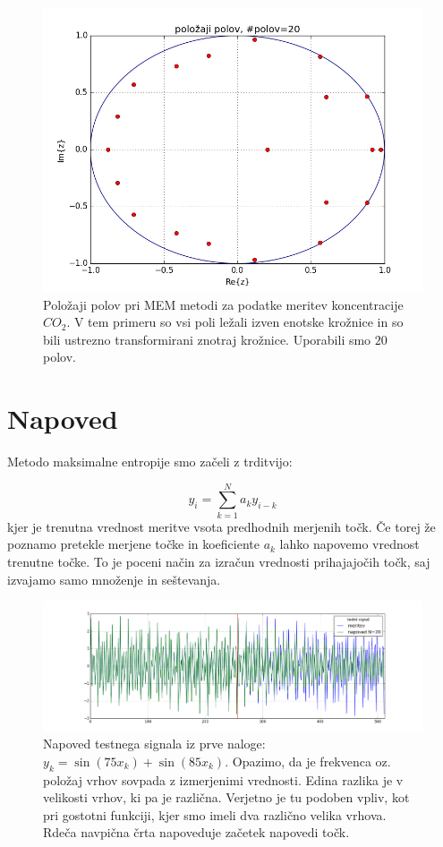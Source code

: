 \documentclass[slovene,11pt,a4paper]{article}
\numberwithin{equation}{section} %
\numberwithin{figure}{section} %
\numberwithin{table}{section} %
\begin{document}
\begin{figure}[!h]
\centering
\includegraphics[scale=0.5]{slike/polozaji_polov.png}
\caption{Položaji polov pri MEM metodi za podatke meritev koncentracije $CO_2$. V tem primeru so vsi poli ležali izven enotske krožnice in so bili ustrezno transformirani znotraj krožnice. Uporabili smo $20$ polov.}
\end{figure}



\FloatBarrier

\section{Napoved}

Metodo maksimalne entropije smo začeli z trditvijo:

\begin{equation}
y_i=\sum_{k=1}^{N} a_k y_{i-k}
\end{equation}
kjer je trenutna vrednost meritve vsota predhodnih merjenih točk. Če torej že poznamo pretekle merjene točke in koeficiente $a_k$ lahko napovemo vrednost trenutne točke. To je poceni način za izračun vrednosti prihajajočih točk, saj izvajamo samo množenje in seštevanja.


\begin{figure}[!h]
\centering
\includegraphics[scale=0.4]{slike/napoved_testni_sin2.png}
\caption{Napoved testnega signala iz prve naloge: $y_k= \sin(75 x_k) + \sin( 85 x_k)$. Opazimo, da je frekvenca oz. položaj vrhov sovpada z izmerjenimi vrednosti. Edina razlika je v velikosti vrhov, ki pa je različna. Verjetno je tu podoben vpliv, kot pri gostotni funkciji, kjer smo imeli dva različno velika vrhova. Rdeča navpična črta napoveduje začetek napovedi točk.}
\end{figure}
\end{document}
